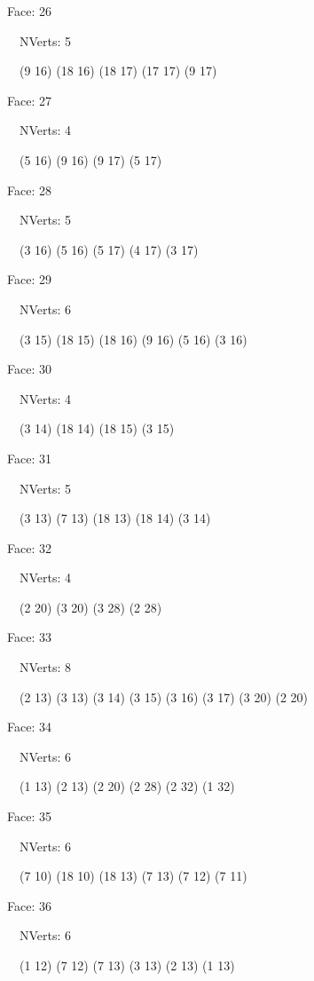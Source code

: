 \documentclass{article}
\begin{document}
{\footnotesize 

Face: 26

\   \    NVerts: 5

 \   \   (9 16) (18 16) (18 17) (17 17) (9 17)}

{\footnotesize 

Face: 27

\   \    NVerts: 4

 \   \   (5 16) (9 16) (9 17) (5 17)}

{\footnotesize 

Face: 28

\   \    NVerts: 5

 \   \   (3 16) (5 16) (5 17) (4 17) (3 17)}

{\footnotesize 

Face: 29

\   \    NVerts: 6

 \   \   (3 15) (18 15) (18 16) (9 16) (5 16) (3 16)}

{\footnotesize 

Face: 30

\   \    NVerts: 4

 \   \   (3 14) (18 14) (18 15) (3 15)}

{\footnotesize 

Face: 31

\   \    NVerts: 5

 \   \   (3 13) (7 13) (18 13) (18 14) (3 14)}

{\footnotesize 

Face: 32

\   \    NVerts: 4

 \   \   (2 20) (3 20) (3 28) (2 28)}

{\footnotesize 

Face: 33

\   \    NVerts: 8

 \   \   (2 13) (3 13) (3 14) (3 15) (3 16) (3 17) (3 20) (2 20)}

{\footnotesize 

Face: 34

\   \    NVerts: 6

 \   \   (1 13) (2 13) (2 20) (2 28) (2 32) (1 32)}

{\footnotesize 

Face: 35

\   \    NVerts: 6

 \   \   (7 10) (18 10) (18 13) (7 13) (7 12) (7 11)}

{\footnotesize 

Face: 36

\   \    NVerts: 6

 \   \   (1 12) (7 12) (7 13) (3 13) (2 13) (1 13)}
\end{document}
